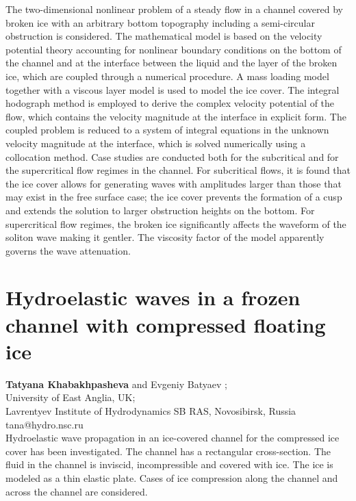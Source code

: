 \documentclass[9pt,a4paper,oneside]{book}
\numberwithin{equation}{section}
\begin{document}
The two-dimensional nonlinear problem of a steady flow in a channel covered by broken ice with an arbitrary bottom topography including a semi-circular obstruction is considered. The mathematical model is based on the velocity potential theory accounting for nonlinear boundary conditions on the bottom of the channel and at the interface between the liquid and the layer of the broken ice, which are coupled through a numerical procedure. A mass loading model together with a viscous layer model is used to model the ice cover. The integral hodograph method is employed to derive the complex velocity potential of the flow, which contains the velocity magnitude at the interface in explicit form. The coupled problem is reduced to a system of integral equations in the unknown velocity magnitude at the interface, which is solved numerically using a collocation method. Case studies are conducted both for the subcritical and for the supercritical flow regimes in the channel. For subcritical flows, it is found that the ice cover allows for generating waves with amplitudes larger than those that may exist in the free surface case; the ice cover prevents the formation of a cusp and extends the solution to larger obstruction heights on the bottom. For supercritical flow regimes, the broken ice significantly affects the waveform of the soliton wave making it gentler. The viscosity factor of the model apparently governs the wave attenuation. 

\section*{Hydroelastic waves in a frozen channel with compressed floating ice}
 \label{abs:10}
   {\bf Tatyana Khabakhpasheva} and Evgeniy Batyaev ;\\
 University of East Anglia, UK;\\
Lavrentyev Institute of Hydrodynamics SB RAS, Novosibirsk, Russia\\
tana@hydro.nsc.ru\\

Hydroelastic wave propagation in an ice-covered channel for the compressed ice cover has been investigated. The channel has a rectangular cross-section. The fluid in the channel is inviscid, incompressible and covered with ice. The ice is modeled as a thin elastic plate. Cases of ice compression along the channel and across the channel are considered.
\end{document}
